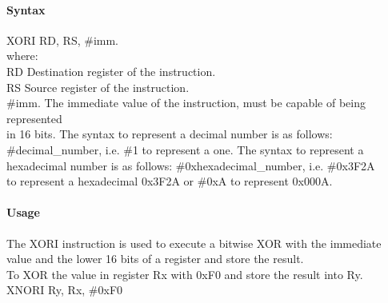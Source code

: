 \documentclass[12pt]{article}
\begin{document}
    \paragraph{Syntax}
    \begin{flushleft}
    XORI RD, RS, \#imm.\\
    \vspace{1em}        %
    where:\\
    \vspace{1em}
    RD  \hspace{3.6em} Destination register of the instruction.\\
    \vspace{1em}
    RS  \hspace{3.85em} Source register of the instruction.\\
    \vspace{1em}
    \#imm.  \hspace{1.8em} The immediate value of the instruction, must be capable of being represented\\             \hspace{5.4em} in 16 bits. The syntax to represent a decimal number is as follows:\\
            \hspace{5.4em} \#decimal\_number, i.e. \#1 to represent a one. The syntax to represent a\\
            \hspace{5.4em} hexadecimal number is as follows: \#0xhexadecimal\_number, i.e. \#0x3F2A \\
            \hspace{5.4em} to represent a hexadecimal 0x3F2A or \#0xA to represent 0x000A.\\
    \end{flushleft}
    
    \paragraph{Usage}
    \begin{flushleft}
    The XORI instruction is used to execute a bitwise XOR with the immediate value and the lower 16 bits of a register and store the result.\\    
    \vspace{1em}
    To XOR the value in register Rx with 0xF0 and store the result into Ry.\\
    \vspace{1em}
    XNORI Ry, Rx, \#0xF0
    \end{flushleft}
    
\end{document}
